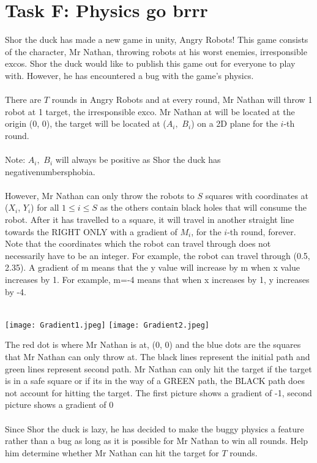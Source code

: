 \documentclass{report}
\begin{document}
\section*{Task F: Physics go brrr}
Shor the duck has made a new game in unity, Angry Robots! This game consists of the character, Mr Nathan, throwing robots at his worst enemies, irresponsible excos. Shor the duck would like to publish this game out for everyone to play with. However, he has encountered a bug with the game's physics.
\\\\
There are $T$ rounds in Angry Robots and at every round, Mr Nathan will throw 1 robot at 1 target, the irresponsible exco. Mr Nathan at will be located at the origin (0, 0), the target will be located at ($A_{i},$ $B_{i}$) on a 2D plane for the $i$-th round.
\\\\
Note: $A_{i},$ $B_{i}$ will always be positive as Shor the duck has negativenumbersphobia.
\\\\
However, Mr Nathan can only throw the robots to $S$ squares with coordinates at ($X_i$, $Y_i$) for all $1 \leq i \leq S$ as the others contain black holes that will consume the robot. After it has travelled to a square, it will travel in another straight line towards the RIGHT ONLY with a gradient of $M_{i}$, for the $i$-th round, forever. Note that the coordinates which the robot can travel through does not necessarily have to be an integer. For example, the robot can travel through (0.5, 2.35).
A gradient of m means that the y value will increase by m when x value increases by 1. For example, m=-4 means that when x increases by 1, y increases by -4.
\\\\
\begin{center}
    \texttt{[image: Gradient1.jpeg]}
    \texttt{[image: Gradient2.jpeg]}
\end{center}
\hfill \break
The red dot is where Mr Nathan is at, (0, 0) and the blue dots are the squares that Mr Nathan can only throw at. The black lines represent the initial path and green lines represent second path. Mr Nathan can only hit the target if the target is in a safe square or if its in the way of a GREEN path, the BLACK path does not account for hitting the target. The first picture shows a gradient of -1, second picture shows a gradient of 0 
\\\\
Since Shor the duck is lazy, he has decided to make the buggy physics a feature rather than a bug as long as it is possible for Mr Nathan to win all rounds. Help him determine whether Mr Nathan can hit the target for $T$ rounds. 
\end{document}
